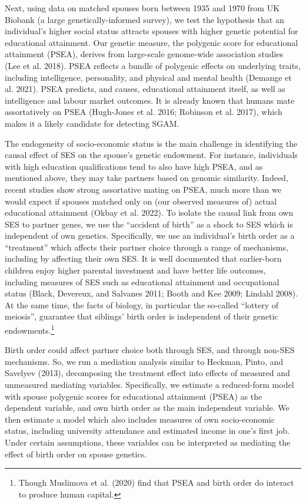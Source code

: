 \documentclass[
]{article}
\theoremstyle{definition}
\theoremstyle{definition}
\theoremstyle{definition}
\theoremstyle{definition}
\theoremstyle{remark}
\begin{document}
Next, using data on matched spouses born between 1935 and 1970 from UK Biobank
(a large genetically-informed survey), we test the hypothesis that an
individual's higher social status attracts spouses with higher genetic potential
for educational attainment. Our genetic measure, the polygenic score for
educational attainment (PSEA), derives from large-scale genome-wide association
studies (Lee et al. 2018). PSEA reflects a bundle of polygenic effects on
underlying traits, including intelligence, personality, and physical and mental
health (Demange et al. 2021). PSEA predicts, and causes, educational
attainment itself, as well as intelligence and labour market outcomes. It is
already known that humans mate assortatively on PSEA (Hugh-Jones et al. 2016; Robinson et al. 2017), which makes it a likely candidate for detecting SGAM.

The endogeneity of socio-economic status is the main challenge in identifying
the causal effect of SES on the spouse's genetic endowment. For instance,
individuals with high education qualifications tend to also have high PSEA, and
as mentioned above, they may take partners based on genomic similarity. Indeed,
recent studies show strong assortative mating on PSEA, much more than we would
expect if spouses matched only on (our observed measures of) actual educational
attainment (Okbay et al. 2022). To isolate the causal link from own SES to
partner genes, we use the ``accident of birth'' as a shock to SES which is
independent of own genetics. Specifically, we use an individual's birth order as
a ``treatment'' which affects their partner choice through a range of mechanisms,
including by affecting their own SES. It is well documented that earlier-born
children enjoy higher parental investment and have better life outcomes,
including measures of SES such as educational attainment and occupational status
(Black, Devereux, and Salvanes 2011; Booth and Kee 2009; Lindahl 2008). At the same time, the facts of
biology, in particular the so-called ``lottery of meiosis'', guarantee that
siblings' birth order is independent of their genetic endowments.\footnote{Though Muslimova et al. (2020) find that PSEA and birth order do interact to produce human capital.}

Birth order could affect partner choice both through SES, and through non-SES
mechanisms. So, we run a mediation analysis similar to
Heckman, Pinto, and Savelyev (2013), decomposing the treatment effect into effects of
measured and unmeasured mediating variables. Specifically, we estimate a
reduced-form model with spouse polygenic scores for educational attainment
(PSEA) as the dependent variable, and own birth order as the main independent
variable. We then estimate a model which also includes measures of own
socio-economic status, including university attendance and estimated income
in one's first job. Under certain assumptions, these variables can be
interpreted as mediating the effect of birth order on spouse genetics.
\end{document}
